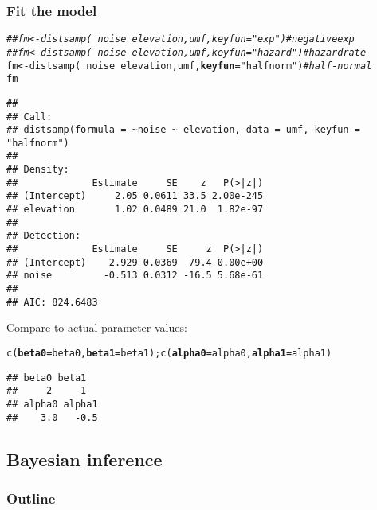 \documentclass[color=usenames,dvipsnames]{beamer}\usepackage[]{graphicx}\usepackage[]{xcolor}
\makeatletter
\newcommand{\hlsng}[1]{\textcolor[rgb]{0.749,0.012,0.012}{#1}}%
\newcommand{\hlcom}[1]{\textcolor[rgb]{0.514,0.506,0.514}{\textit{#1}}}%
\newcommand{\hlopt}[1]{\textcolor[rgb]{0,0,0}{#1}}%
\newcommand{\hldef}[1]{\textcolor[rgb]{0,0,0}{#1}}%
\newcommand{\hlkwb}[1]{\textcolor[rgb]{0,0.341,0.682}{#1}}%
\newcommand{\hlkwc}[1]{\textcolor[rgb]{0,0,0}{\textbf{#1}}}%
\newcommand{\hlkwd}[1]{\textcolor[rgb]{0.004,0.004,0.506}{#1}}%
\newenvironment{kframe}{%
 \def\at@end@of@kframe{}%
 \ifinner\ifhmode%
  \def\at@end@of@kframe{\end{minipage}}%
  \begin{minipage}{\columnwidth}%
 \fi\fi%
 \def\FrameCommand##1{\hskip\@totalleftmargin \hskip-\fboxsep
 \colorbox{shadecolor}{##1}\hskip-\fboxsep
     \hskip-\linewidth \hskip-\@totalleftmargin \hskip\columnwidth}%
 \MakeFramed {\advance\hsize-\width
   \@totalleftmargin\z@ \linewidth\hsize
   \@setminipage}}%
 {\par\unskip\endMakeFramed%
 \at@end@of@kframe}
\newenvironment{knitrout}{}{} %
\makeatother
\begin{document}
\begin{frame}[fragile]
  \frametitle{Fit the model}
  \footnotesize
\begin{knitrout}\tiny
{}\color{fgcolor}\begin{kframe}
\begin{alltt}
\hlcom{## fm <- distsamp(~noise ~elevation, umf, keyfun="exp")     # negative exp}
\hlcom{## fm <- distsamp(~noise ~elevation, umf, keyfun="hazard")  # hazard rate}
\hldef{fm} \hlkwb{<-} \hlkwd{distsamp}\hldef{(}\hlopt{~}\hldef{noise} \hlopt{~}\hldef{elevation, umf,} \hlkwc{keyfun}\hldef{=}\hlsng{"halfnorm"}\hldef{)}   \hlcom{# half-normal}
\hldef{fm}
\end{alltt}
\begin{verbatim}
## 
## Call:
## distsamp(formula = ~noise ~ elevation, data = umf, keyfun = "halfnorm")
## 
## Density:
##             Estimate     SE    z   P(>|z|)
## (Intercept)     2.05 0.0611 33.5 2.00e-245
## elevation       1.02 0.0489 21.0  1.82e-97
## 
## Detection:
##             Estimate     SE     z  P(>|z|)
## (Intercept)    2.929 0.0369  79.4 0.00e+00
## noise         -0.513 0.0312 -16.5 5.68e-61
## 
## AIC: 824.6483
\end{verbatim}
\end{kframe}
\end{knitrout}
\pause
\vfill
Compare to actual parameter values:
\vspace{-6pt}
\begin{knitrout}\tiny
{}\color{fgcolor}\begin{kframe}
\begin{alltt}
\hlkwd{c}\hldef{(}\hlkwc{beta0}\hldef{=beta0,} \hlkwc{beta1}\hldef{=beta1);} \hlkwd{c}\hldef{(}\hlkwc{alpha0}\hldef{=alpha0,} \hlkwc{alpha1}\hldef{=alpha1)}
\end{alltt}
\begin{verbatim}
## beta0 beta1 
##     2     1
## alpha0 alpha1 
##    3.0   -0.5
\end{verbatim}
\end{kframe}
\end{knitrout}
\end{frame}




\subsection{Bayesian inference}


\begin{frame}
  \frametitle{Outline}
  \Large
\end{frame}
\end{document}
